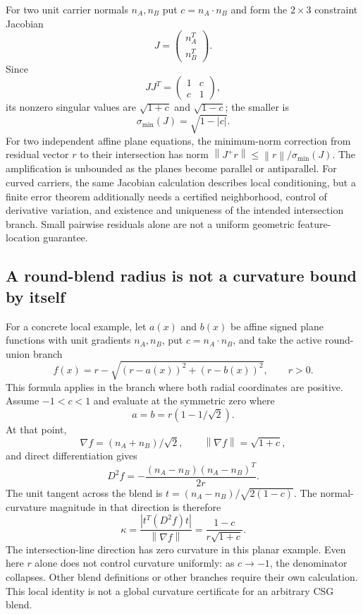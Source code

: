 \documentclass[11pt]{article}
\theoremstyle{definition}
\theoremstyle{remark}
\newcommand{\norm}[1]{\left\lVert #1\right\rVert}
\begin{document}
For two unit carrier normals $n_A,n_B$ put $c=n_A\cdot n_B$ and
form the $2\times3$ constraint Jacobian
\[
  J=\begin{pmatrix}n_A^T\\n_B^T\end{pmatrix}.
\]
Since
\[
  JJ^T=\begin{pmatrix}1&c\\c&1\end{pmatrix},
\]
its nonzero singular values are $\sqrt{1+c}$ and $\sqrt{1-c}$;
the smaller is
\[
  \sigma_{\min}(J)=\sqrt{1-|c|}. \tag{13}\label{eq:conditioning}
\]
For two independent affine plane equations, the minimum-norm correction
from residual vector $r$ to their intersection has norm
$\norm{J^+r}\le\norm r/\sigma_{\min}(J)$. The amplification is
unbounded as the planes become parallel or antiparallel. For curved
carriers, the same Jacobian calculation describes local conditioning,
but a finite error theorem additionally needs a certified neighborhood,
control of derivative variation, and existence and uniqueness of the
intended intersection branch. Small pairwise residuals alone are not
a uniform geometric feature-location guarantee.

\subsection{A round-blend radius is not a curvature bound by itself}

For a concrete local example, let $a(x)$ and $b(x)$ be affine signed
plane functions with unit gradients $n_A,n_B$, put $c=n_A\cdot n_B$,
and take the active round-union branch
\[
  f(x)=r-\sqrt{(r-a(x))^2+(r-b(x))^2},\qquad r>0.
\]
This formula applies in the branch where both radial coordinates are
positive. Assume $-1<c<1$ and evaluate at the symmetric zero where
\[
  a=b=r(1-1/\sqrt2).
\]
At that point,
\[
  \nabla f=(n_A+n_B)/\sqrt2,\qquad
  \norm{\nabla f}=\sqrt{1+c},
\]
and direct differentiation gives
\[
  D^2 f=-\frac{(n_A-n_B)(n_A-n_B)^T}{2r}.
\]
The unit tangent across the blend is
$t=(n_A-n_B)/\sqrt{2(1-c)}$. The normal-curvature magnitude in
that direction is therefore
\[
  \kappa=\frac{|t^T(D^2 f)t|}{\norm{\nabla f}}
    =\frac{1-c}{r\sqrt{1+c}}. \tag{14}\label{eq:round-curvature}
\]
The intersection-line direction has zero curvature in this planar
example. Even here $r$ alone does not control curvature uniformly:
as $c\to-1$, the denominator collapses. Other blend definitions or
other branches require their own calculation. This local identity
is not a global curvature certificate for an arbitrary CSG blend.
\end{document}
